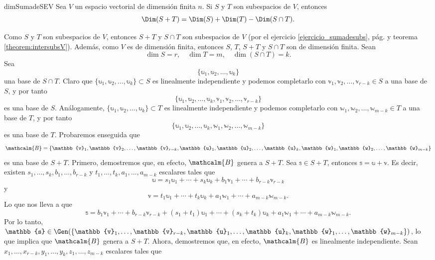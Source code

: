 \newpage

\begin{theorem}{}{dimSumadeSEV}
    Sea $V$ un espacio vectorial de dimensión finita $n$. Si $S$ y $T$ son subespacios de $V$, entonces
    $$\Dim (S + T) = \Dim(S) + \Dim(T) - \Dim(S \cap T).$$

    \tcblower
    \demostracion Como $S$ y $T$ son subespacios de $V$, entonces $S + T$ y $S \cap T$ son subespacios de $V$ (por el ejercicio \ref{ejercicio_sumadesubs}, pág. \pageref{ejercicio_sumadesubs} y teorema \ref{theorem:intersubsV}). Además, como $V$ es de dimensión finita, entonces $S$, $T$, $S + T$ y $S \cap T$ son de dimensión finita. Sean
    $$\dim S = r, \quad \dim T = m, \quad \dim (S \cap T) = k.$$
    Sea
    $$\{\mathbb{u}_1, \mathbb{u}_2, \dots, \mathbb{u}_k\}$$
    una base de $S \cap T$. Claro que $\{\mathbb{u}_1, \mathbb{u}_2, \dots, \mathbb{u}_k\} \subset S$ es linealmente independiente y podemos completarlo con $\mathbb{v}_1, \mathbb{v}_2, \dots, \mathbb{v}_{r-k} \in S$ a una base de $S$, y por tanto
    $$\{\mathbb{u}_1, \mathbb{u}_2, \dots, \mathbb{u}_k, \mathbb{v}_1, \mathbb{v}_2, \dots, \mathbb{v}_{r-k}\}$$
    es una base de $S$. Análogamente, $\{\mathbb{u}_1, \mathbb{u}_2, \dots, \mathbb{u}_k\} \subset T$ es linealmente independiente y podemos completarlo con $\mathbb{w}_1, \mathbb{w}_2, \dots, \mathbb{w}_{m-k} \in T$ a una base de $T$, y por tanto
    $$\{\mathbb{u}_1, \mathbb{u}_2, \dots, \mathbb{u}_k, \mathbb{w}_1, \mathbb{w}_2, \dots, \mathbb{w}_{m-k}\}$$
    es una base de $T$. Probaremos enseguida que
    $$\mathcalm{B} = \{\mathbb{v}_1, \mathbb{v}_2, \dots, \mathbb{v}_{r-k}, \mathbb{u}_1, \mathbb{u}_2, \dots, \mathbb{u}_k, \mathbb{w}_1, \mathbb{w}_2, \dots, \mathbb{w}_{m-k}\}$$
    es una base de $S + T$. Primero, demostremos que, en efecto, $\mathcalm{B}$ genera a $S + T$. Sea $\mathbb{s} \in S + T$, entonces $\mathbb{s} = \mathbb{u} + \mathbb{v}$. Es decir, existen $s_1, \dots, s_k, b_1, \dots, b_{r-k}$ y $t_1, \dots, t_k, a_1, \dots, a_{m-k}$ escalares tales que
    $$\mathbb{u} = s_1 \mathbb{u}_1 + \cdots + s_k \mathbb{u}_k + b_1 \mathbb{v}_1 + \cdots + b_{r-k} \mathbb{v}_{r-k}$$
    y
    $$\mathbb{v} = t_1 \mathbb{u}_1 + \cdots + t_k \mathbb{u}_k + a_1 \mathbb{w}_1 + \cdots + a_{m-k} \mathbb{w}_{m-k}.$$
    Lo que nos lleva a que
    $$\mathbb{s} = b_1 \mathbb{v}_1 + \cdots + b_{r-k} \mathbb{v}_{r-k} + (s_1 + t_1)\mathbb{u}_1 + \cdots + (s_k + t_k)\mathbb{u}_k + a_1 \mathbb{w}_1 + \cdots + a_{m-k} \mathbb{w}_{m-k}.$$
    Por lo tanto, $\mathbb{s} \in \Gen (\{\mathbb{v}_1, \dots, \mathbb{v}_{r-k}, \mathbb{u}_1, \dots, \mathbb{u}_k, \mathbb{w}_1, \dots, \mathbb{w}_{m-k}\})$, lo que implica que $\mathcalm{B}$ genera a $S + T$. Ahora, demostremos que, en efecto, $\mathcalm{B}$ es linealmente independiente. Sean $x_1, \dots, x_{r-k}, y_1, \dots, y_k, z_1, \dots, z_{m-k}$ escalares tales que

\end{theorem}
